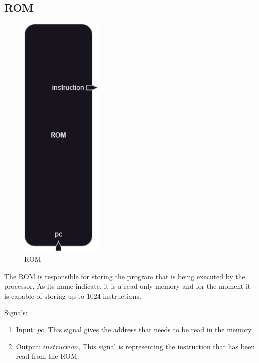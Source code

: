 \subsection{ROM}

\begin{figure}[H]
    \centering
    \includegraphics[width=0.35\textwidth]{../diagrams/rom_ram_reg/rom.png}
    \caption{ROM}
    \label{fig:rom}
\end{figure}

The ROM is responsible for storing the program that is being executed by the processor. As its name indicate, it is 
a read-only memory and for the moment it is capable of storing up-to 1024 instructions.

Signals:
\begin{enumerate}[label={\textbullet}]
    \item Input: $pc$, This signal gives the address that needs to be read in the memory.
    \item Output: $instruction$, This signal is representing the instruction that has been read from the ROM.
\end{enumerate}